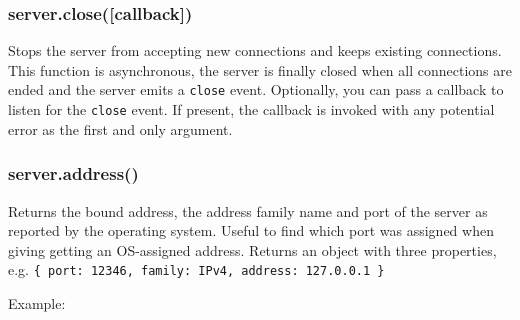 \begin{Shaded}
\begin{Highlighting}[]
\NormalTok{(\{}
  \NormalTok{: }\NormalTok{,}
  \NormalTok{: }\NormalTok{,}
  \NormalTok{: }
\NormalTok{\});}
\end{Highlighting}
\end{Shaded}

\subsubsection{server.close({[}callback{]})}\label{server.closecallback}

Stops the server from accepting new connections and keeps existing
connections. This function is asynchronous, the server is finally closed
when all connections are ended and the server emits a
\texttt{\textquotesingle{}close\textquotesingle{}} event. Optionally,
you can pass a callback to listen for the
\texttt{\textquotesingle{}close\textquotesingle{}} event. If present,
the callback is invoked with any potential error as the first and only
argument.

\subsubsection{server.address()}\label{server.address}

Returns the bound address, the address family name and port of the
server as reported by the operating system. Useful to find which port
was assigned when giving getting an OS-assigned address. Returns an
object with three properties, e.g.
\texttt{\{\ port:\ 12346,\ family:\ \textquotesingle{}IPv4\textquotesingle{},\ address:\ \textquotesingle{}127.0.0.1\textquotesingle{}\ \}}

Example:

\begin{Shaded}
\end{Shaded}

